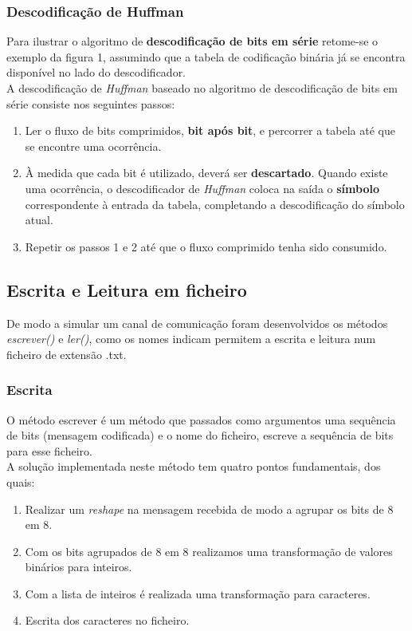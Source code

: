 \documentclass[12pt,a4paper]{article}
\begin{document}
\subsubsection{Descodificação de Huffman}
Para ilustrar o algoritmo de \textbf{descodificação de bits em série} retome-se o exemplo da figura 1, assumindo que a tabela de codificação binária já se encontra disponível no lado do descodificador.\\
A descodificação de \textit{Huffman} baseado no algoritmo de descodificação de bits em série consiste nos seguintes passos:
\begin{enumerate}
\item Ler o fluxo de bits comprimidos, \textbf{bit após bit}, e percorrer a tabela até que se encontre uma ocorrência.
\item À medida que cada bit é utilizado, deverá ser \textbf{descartado}. Quando existe uma ocorrência, o descodificador de \textit{Huffman} coloca na saída o \textbf{símbolo} correspondente à entrada da tabela, completando a descodificação do símbolo atual.
\item Repetir os passos 1 e 2 até que o fluxo comprimido tenha sido consumido.
\end{enumerate}

\subsection{Escrita e Leitura em ficheiro}
De modo a simular um canal de comunicação foram desenvolvidos os métodos \textit{escrever()} e \textit{ler()}, como os nomes indicam permitem a escrita e leitura num ficheiro de extensão .txt.

\subsubsection{Escrita}
O método escrever é um método que passados como argumentos uma sequência de bits (mensagem codificada) e o nome do ficheiro, escreve a sequência de bits para esse ficheiro.\\ A solução implementada neste método tem quatro pontos fundamentais, dos quais:
\begin{enumerate}
\item Realizar um \textit{reshape} na mensagem recebida de modo a agrupar os bits de 8 em 8.
\item Com os bits agrupados de 8 em 8 realizamos uma transformação de valores binários para inteiros.
\item Com a lista de inteiros é realizada uma transformação para caracteres.
\item Escrita dos caracteres no ficheiro.
\end{enumerate}
\end{document}
